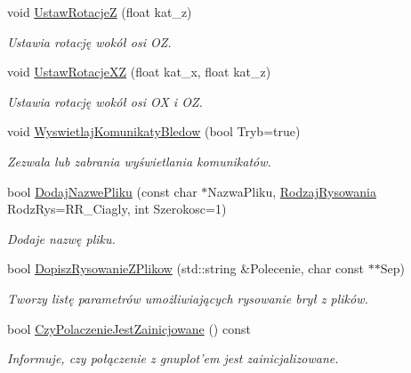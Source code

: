 \begin{DoxyCompactItemize}
void \hyperlink{class_pz_g_1_1_lacze_do_g_n_u_plota_a458399aa2a8f4b3f00ccd5b272857ea1}{Ustaw\+Rotacje\+Z} (float kat\+\_\+z)
\begin{DoxyCompactList}\small\item\em Ustawia rotację wokół osi {\itshape O\+Z}. \end{DoxyCompactList}\item 
void \hyperlink{class_pz_g_1_1_lacze_do_g_n_u_plota_a94d8527fd78048ed6cb32ffb29e5f903}{Ustaw\+Rotacje\+X\+Z} (float kat\+\_\+x, float kat\+\_\+z)
\begin{DoxyCompactList}\small\item\em Ustawia rotację wokół osi {\itshape O\+X} i {\itshape O\+Z}. \end{DoxyCompactList}\item 
void \hyperlink{class_pz_g_1_1_lacze_do_g_n_u_plota_a4531e6d166faf2e2c8bb4a54a9c9e1f8}{Wyswietlaj\+Komunikaty\+Bledow} (bool Tryb=true)
\begin{DoxyCompactList}\small\item\em Zezwala lub zabrania wyświetlania komunikatów. \end{DoxyCompactList}\item 
bool \hyperlink{class_pz_g_1_1_lacze_do_g_n_u_plota_a34bd48f57c0fd69c12bf4127a1cacd8f}{Dodaj\+Nazwe\+Pliku} (const char $\ast$Nazwa\+Pliku, \hyperlink{namespace_pz_g_a705c92106f39b7d0c34a6739d10ff0b6}{Rodzaj\+Rysowania} Rodz\+Rys=R\+R\+\_\+\+Ciagly, int Szerokosc=1)
\begin{DoxyCompactList}\small\item\em Dodaje nazwę pliku. \end{DoxyCompactList}\item 
bool \hyperlink{class_pz_g_1_1_lacze_do_g_n_u_plota_ad3d7607946b82aa941d786dcd086d27e}{Dopisz\+Rysowanie\+Z\+Plikow} (std\+::string \&Polecenie, char const $\ast$$\ast$Sep)
\begin{DoxyCompactList}\small\item\em Tworzy listę parametrów umożliwiających rysowanie brył z plików. \end{DoxyCompactList}\item 
bool \hyperlink{class_pz_g_1_1_lacze_do_g_n_u_plota_ab5045a46f45c989f92209b543e484085}{Czy\+Polaczenie\+Jest\+Zainicjowane} () const 
\begin{DoxyCompactList}\small\item\em Informuje, czy połączenie z {\itshape gnuplot'em} jest zainicjalizowane. \end{DoxyCompactList}\item 
$$
\end{DoxyCompactItemize}
